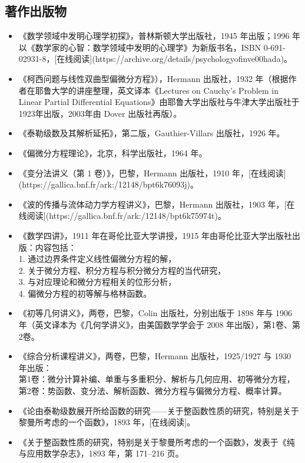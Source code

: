 \subsection{著作出版物}
\begin{itemize}
\item 《数学领域中发明心理学初探》，普林斯顿大学出版社，1945 年出版；1996 年以《数学家的心智：数学领域中发明的心理学》为新版书名，ISBN 0-691-02931-8，[在线阅读](https://archive.org/details/psychologyofinve00hada)。
\item 《柯西问题与线性双曲型偏微分方程》），Hermann 出版社，1932 年（根据作者在耶鲁大学的讲座整理，英文译本《Lectures on Cauchy's Problem in Linear Partial Differential Equations》由耶鲁大学出版社与牛津大学出版社于1923年出版，2003年由 Dover 出版社再版）。
\item 《泰勒级数及其解析延拓》，第二版，Gauthier-Villars 出版社，1926 年。
\item 《偏微分方程理论》，北京，科学出版社，1964 年。
\item 《变分法讲义（第 1 卷）》，巴黎，Hermann 出版社，1910 年，[在线阅读](https://gallica.bnf.fr/ark:/12148/bpt6k76093j)。
\item 《波的传播与流体动力学方程讲义》，巴黎，Hermann 出版社，1903 年，[在线阅读](https://gallica.bnf.fr/ark:/12148/bpt6k75974t)。
\item 《数学四讲》，1911 年在哥伦比亚大学讲授，1915 年由哥伦比亚大学出版社出版：内容包括：\\
1. 通过边界条件定义线性偏微分方程的解，\\
2. 关于微分方程、积分方程与积分微分方程的当代研究，\\
3. 与对应理论和微分方程相关的位形分析，\\
4. 偏微分方程的初等解与格林函数。\\
\item 《初等几何讲义》，两卷，巴黎，Colin 出版社，分别出版于 1898 年与 1906 年（英文译本为《几何学讲义》，由美国数学学会于 2008 年出版），第1卷、第2卷。
\item 《综合分析课程讲义》，两卷，巴黎，Hermann 出版社，1925/1927 与 1930 年出版：\\
第1卷：微分计算补编、单重与多重积分、解析与几何应用、初等微分方程，\\
第2卷：势函数、变分法、解析函数、微分方程与偏微分方程、概率计算。\\
\item 《论由泰勒级数展开所给函数的研究——关于整函数性质的研究，特别是关于黎曼所考虑的一个函数》，1893 年，[在线阅读]。
\item 《关于整函数性质的研究，特别是关于黎曼所考虑的一个函数》，发表于《纯与应用数学杂志》，1893 年，第 171–216 页。

\end{itemize}
